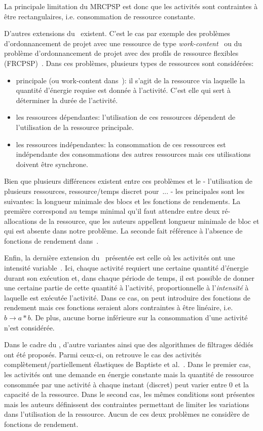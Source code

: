 La principale limitation du MRCPSP est donc que les activités sont
contraintes à être rectangulaires, i.e. consommation de ressource
constante. 

D'autres extensions du \RCPSP~existent. C'est le cas par exemple des
problèmes d'ordonnancement de projet avec une ressource de type {\it
  work-content}~\cite{FT} ou du problème d'ordonnancement de projet
avec des profils de ressource flexibles (FRCPSP)~\cite{NK}. Dans ces
problèmes, plusieurs types de ressources sont considérées: 
\begin{itemize}
\item principale (ou work-content dans~\cite{FT}): il s'agit de la
  ressource via laquelle la quantité d'énergie requise est donnée à
  l'activité. C'est elle qui sert à déterminer la durée de l'activité.
\item les ressources dépendantes: l'utilisation de ces ressources
  dépendent de l'utilisation de la ressource principale.
\item les ressources indépendantes: la consommation de ces ressources
  est indépendante des consommations des autres ressources mais ces
  utilisations doivent être synchrone. 
\end{itemize}
Bien que plusieurs différences existent entre ces problèmes et le
\CECSP - l'utilisation de plusieurs ressources, ressource/temps discret
pour~\cite{FT}... - les principales sont les suivantes: la longueur
minimale des blocs et les fonctions de rendements. La première
correspond au temps minimal qu'il faut attendre entre deux
ré-allocations de la ressource, que les auteurs appellent longueur
minimale de bloc et qui est absente dans notre problème. La seconde
fait référence à l'absence de fonctions de rendement dans~\cite{FT}.

Enfin, la dernière extension du \RCPSP~présentée est celle où les
activités ont une intensité variable~\cite{Kis}. Ici, chaque activité
requiert une certaine quantité d'énergie durant son exécution et, dans
chaque période de temps, il est possible de donner une certaine partie
de cette quantité à l'activité, proportionnelle à l'{\it intensité} à
laquelle est exécutée l'activité. Dans ce cas, on peut introduire des
fonctions de rendement mais ces fonctions seraient alors contraintes à
être linéaire, i.e. $b \rightarrow a*b$. De plus, aucune borne
inférieure sur la consommation d'une activité n'est considérée. 

Dans le cadre du \CUSP, d'autre variantes ainsi que des algorithmes de
filtrages dédiés ont été proposés. Parmi ceux-ci, on retrouve le cas
des activités complètement/partiellement élastiques de Baptiste et
al.~\cite{BLN}. Dans le premier cas, les activités ont une demande en
énergie constante mais la quantité de ressource consommée par
une activité à chaque instant (discret) peut varier entre $0$ et la
capacité de la ressource. Dans le second cas, les mêmes conditions
sont présentes mais les auteurs définissent des contraintes permettant
de limiter les variations dans l'utilisation de la ressource. Aucun de
ces deux problèmes ne considère de fonctions de rendement. 

